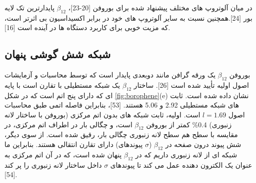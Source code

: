 در میان آلوتروپ های مختلف پیشنهاد شده برای بوروفن [20-23]، $\beta_{12}$  پایدارترین تک لایه بور [24].همچنین نسبت به سایر آلوتروپ های خود در برابر اکسیداسیون بی اثرتر است، که مزیت خوبی برای کاربرد دستگاه ها در آینده است [16].


\subsection{شبکه شش گوشی پنهان}
بوروفن $\beta_{12}$ یک ورقه گرافن مانند دوبعدی پایدار است که توسط محاسبات و آزمایشات اصول اولیه تأیید شده است [26]. ساختار $\beta_{12}$ یک شبکه مستطیلی با تقارن  است با پایه ای که دارای پنج اتم است که در شکل \ref{fig:borophene}(e) نشان داده شده است. ثابت های شبکه مستطیلی \lr{\AA}2.92 و \lr{\AA}5.06 هستند. [53]، بنابراین فاصله اتمی  طبق محاسبات اصول \lr{\AA} $l=1.69$ است. اولیه، ثابت شبکه  های بدون اتم مرکزی (بوروفن با ساختار لانه زنبوری) 0.4\% کمتر از بوروفن $\beta_{12}$ است، و چگالی بار در اطراف اتم مرکزی، در مقایسه با سطح هم سطح لانه زنبوری چگالی بار، رقیق شده است. از سوی دیگر، شش پیوند درون صفحه در $\beta_{12}$ ($\sigma$ پیوندهای) دارای تقارن انتقالی هستند. بنابراین ما شبکه ای از لانه زنبوری داریم که در $\beta_{12}$ پنهان شده است، که در آن اتم مرکزی به عنوان یک الکترون دهنده عمل می کند تا پیوندهای $\sigma$ داخل ساختار لانه زنبوری را پر کند [54]. 

